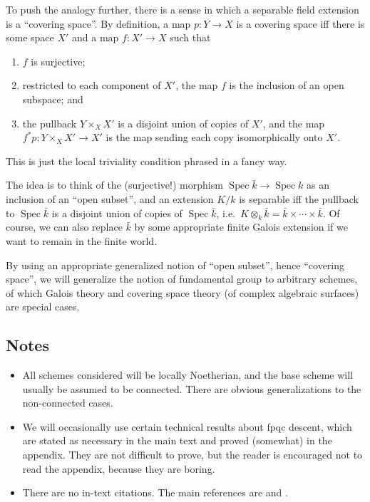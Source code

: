 \documentclass{shortart}
\theoremstyle{definition}
\DeclareMathOperator\Spec{Spec}
\begin{document}
To push the analogy further, there is a sense in which a separable field extension is a ``covering space''. By definition, a map $p: Y \to X$ is a covering space iff there is some space $X'$ and a map $f: X' \to X$ such that
\begin{enumerate}
  \item $f$ is surjective;
  \item restricted to each component of $X'$, the map $f$ is the inclusion of an open subspace; and
  \item the pullback $Y \times_X X'$ is a disjoint union of copies of $X'$, and the map $f^*p: Y \times_{X} X' \to X'$ is the map sending each copy isomorphically onto $X'$.
\end{enumerate}
This is just the local triviality condition phrased in a fancy way.

The idea is to think of the (surjective!) morphism $\Spec \bar{k} \to \Spec k$ as an inclusion of an ``open subset'', and an extension $K/k$ is separable iff the pullback to $\Spec \bar{k}$ is a disjoint union of copies of $\Spec \bar{k}$, i.e.\ $K \otimes_k \bar{k} = \bar{k} \times \cdots \times \bar{k}$. Of course, we can also replace $\bar{k}$ by some appropriate finite Galois extension if we want to remain in the finite world.

By using an appropriate generalized notion of ``open subset'', hence ``covering space'', we will generalize the notion of fundamental group to arbitrary schemes, of which Galois theory and covering space theory (of complex algebraic surfaces) are special cases.

\subsection*{Notes}
\begin{itemize}
  \item All schemes considered will be locally Noetherian, and the base scheme will usually be assumed to be connected. There are obvious generalizations to the non-connected cases.
  \item We will occasionally use certain technical results about fpqc descent, which are stated as necessary in the main text and proved (somewhat) in the appendix. They are not difficult to prove, but the reader is encouraged not to read the appendix, because they are boring.
  \item There are no in-text citations. The main references are \cite{SGA1} and \cite{galois_groups_and_fundamental_groups}.
\end{itemize}
\end{document}
